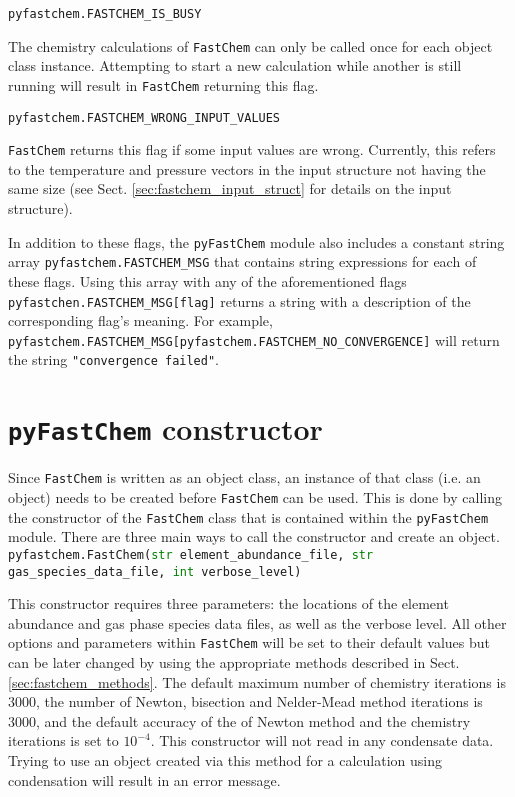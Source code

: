 \documentclass[numbers=noenddot]{aux/fcmanual}
\newcommand{\fc}{\texttt{FastChem}\xspace}
\newcommand{\pfc}{\texttt{pyFastChem}\xspace}
\begin{document}
\bigbreak
      
\lstinline!pyfastchem.FASTCHEM_IS_BUSY!
\begin{addmargin}[25pt]{0pt}
  The chemistry calculations of \fc can only be called once for each object class instance. Attempting to start a new calculation while another is still running will result in \fc returning this flag.
\end{addmargin}
        
\bigbreak
        
\lstinline!pyfastchem.FASTCHEM_WRONG_INPUT_VALUES!
\begin{addmargin}[25pt]{0pt}
  \fc returns this flag if some input values are wrong. Currently, this refers to the temperature and pressure vectors in the input structure not having the same size (see Sect. \ref{sec:fastchem_input_struct} for details on the input structure).
\end{addmargin}

\bigbreak
          
In addition to these flags, the \pfc module also includes a constant string array \lstinline!pyfastchem.FASTCHEM_MSG! that contains string expressions for each of these flags. Using this array with any of the aforementioned flags \lstinline!pyfastchen.FASTCHEM_MSG[flag]! returns a string with a description of the corresponding flag's meaning. For example, \lstinline!pyfastchem.FASTCHEM_MSG[pyfastchem.FASTCHEM_NO_CONVERGENCE]! will return the string \lstinline!"convergence failed"!.


\section{\pfc constructor}

Since \fc is written as an object class, an instance of that class (i.e. an object) needs to be created before \fc can be used. This is done by calling the constructor of the \fc class that is contained within the \pfc module. There are three main ways to call the constructor and create an object.\\


\lstinline[language=Python, breaklines=true]!pyfastchem.FastChem(str element_abundance_file, str gas_species_data_file, int verbose_level)!
\begin{addmargin}[25pt]{0pt}
	This constructor requires three parameters: the locations of the element abundance and gas phase species data files, as well as the verbose level. All other options and parameters within \fc will be set to their default values but can be later changed by using the appropriate methods described in Sect. \ref{sec:fastchem_methods}. The default maximum number of chemistry iterations is 3000, the number of Newton, bisection and Nelder-Mead method iterations is 3000, and the default accuracy of the of Newton method and the chemistry iterations is set to $10^{-4}$. This constructor will not read in any condensate data. Trying to use an object created via this method for a calculation using condensation will result in an error message.
\end{addmargin}
\end{document}
